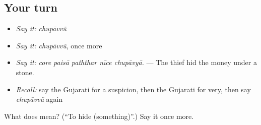 \subsection*{Your turn}
\begin{itemize}
\raggedright
  \item \emph{Say it:} \emph{chupāvvũ}
  \item \emph{Say it:} \emph{chupāvvũ}, once more
  \item \emph{Say it:} \emph{core paisā paththar nīce chupāvyā.} — The thief hid the money under a stone.
  \item \emph{Recall:} say the Gujarati for a suspicion, then the Gujarati for very, then say \emph{chupāvvũ} again
\end{itemize}

\begin{tcolorbox}[breakable,colback=teal!4,colframe=teal!35!black,title={Before you move on}]
What does  mean? (\textquotedblleft{}To hide (something)\textquotedblright{}.) Say it once more.
\end{tcolorbox}
